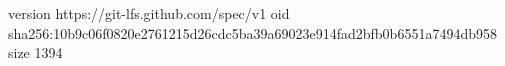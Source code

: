 version https://git-lfs.github.com/spec/v1
oid sha256:10b9c06f0820e2761215d26cdc5ba39a69023e914fad2bfb0b6551a7494db958
size 1394
